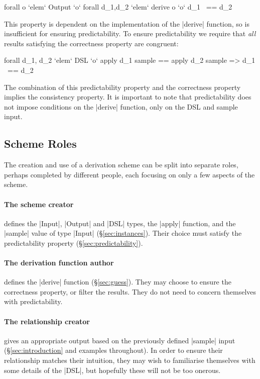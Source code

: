 \documentclass{llncs}
\begin{document}
\ignore\begin{code}
forall o `elem` Output `o` forall d_1,d_2 `elem` derive o `o` d_1 ~== d_2
\end{code}

This property is dependent on the implementation of the |derive| function, so is insufficient for ensuring predictability. To ensure predictability we require that \textit{all} results satisfying the correctness property are congruent:

\ignore\begin{code}
forall d_1, d_2 `elem` DSL `o` apply d_1 sample == apply d_2 sample => d_1 ~== d_2
\end{code}

The combination of this predictability property and the correctness property implies the consistency property. It is important to note that predictability does not impose conditions on the |derive| function, only on the DSL and sample input.

\subsection{Scheme Roles}

The creation and use of a derivation scheme can be split into separate roles, perhaps completed by different people, each focusing on only a few aspects of the scheme.

\paragraph{The scheme creator} defines the |Input|, |Output| and |DSL| types, the |apply| function, and the |sample| value of type |Input| (\S\ref{sec:instances}). Their choice must satisfy the predictability property (\S\ref{sec:predictability}).

\paragraph{The derivation function author} defines the |derive| function (\S\ref{sec:guess}). They may choose to ensure the correctness property, or filter the results. They do not need to concern themselves with predictability.

\paragraph{The relationship creator} gives an appropriate output based on the previously defined |sample| input (\S\ref{sec:introduction} and examples throughout). In order to ensure their relationship matches their intuition, they may wish to familiarise themselves with some details of the |DSL|, but hopefully these will not be too onerous.
\end{document}
